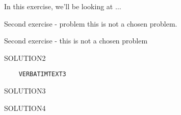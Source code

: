 \begin{intro}
  In this exercise, we'll be looking at \( \dots \)
\end{intro}
\begin{problem}
  Second exercise - problem this is not a chosen problem.
\end{problem}
\begin{problem}
  Second exercise - this is not a chosen problem
\end{problem}
\begin{solution}
SOLUTION2
\end{solution}

\begin{problem}
  \lipsum[1]
  \begin{verbatim}
    VERBATIMTEXT3
  \end{verbatim}
\begin{solution}
SOLUTION3
\end{solution}
\end{problem}
\begin{problem}
  \lipsum[2-3]
\end{problem}
\begin{solution}
SOLUTION4
\end{solution}
\begin{problem}
  \lipsum[4]
\end{problem}
